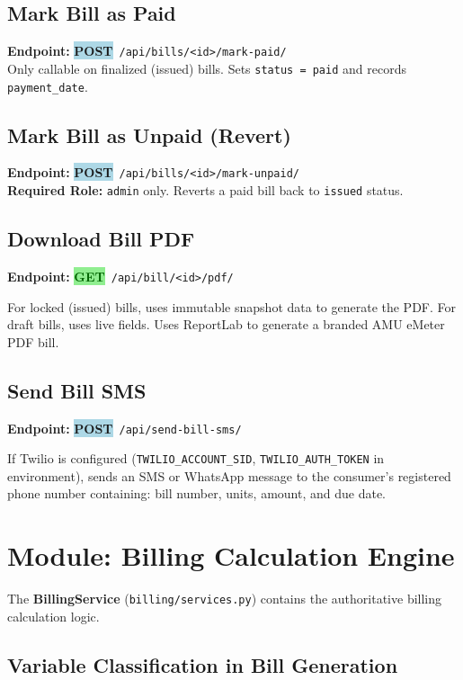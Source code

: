 \documentclass[12pt, a4paper]{report}
\newcommand{\httpget}{\colorbox{lightGreen}{\textcolor{darkGreen}{\textbf{\small GET}}}}
\newcommand{\httppost}{\colorbox{lightBlue}{\textcolor{deepBlue}{\textbf{\small POST}}}}
\begin{document}
\subsection{Mark Bill as Paid}
\textbf{Endpoint:} \httppost\ \texttt{/api/bills/<id>/mark-paid/}\\
Only callable on finalized (issued) bills. Sets \texttt{status = paid} and records \texttt{payment\_date}.

\subsection{Mark Bill as Unpaid (Revert)}
\textbf{Endpoint:} \httppost\ \texttt{/api/bills/<id>/mark-unpaid/}\\
\textbf{Required Role:} \texttt{admin} only. Reverts a paid bill back to \texttt{issued} status.

\subsection{Download Bill PDF}
\textbf{Endpoint:} \httpget\ \texttt{/api/bill/<id>/pdf/}

For locked (issued) bills, uses immutable snapshot data to generate the PDF. For draft bills, uses live fields. Uses ReportLab to generate a branded AMU eMeter PDF bill.

\subsection{Send Bill SMS}
\textbf{Endpoint:} \httppost\ \texttt{/api/send-bill-sms/}

If Twilio is configured (\texttt{TWILIO\_ACCOUNT\_SID}, \texttt{TWILIO\_AUTH\_TOKEN} in environment), sends an SMS or WhatsApp message to the consumer's registered phone number containing: bill number, units, amount, and due date.

\section{Module: Billing Calculation Engine}

The \textbf{BillingService} (\texttt{billing/services.py}) contains the authoritative billing calculation logic.

\subsection*{Variable Classification in Bill Generation}
\end{document}
